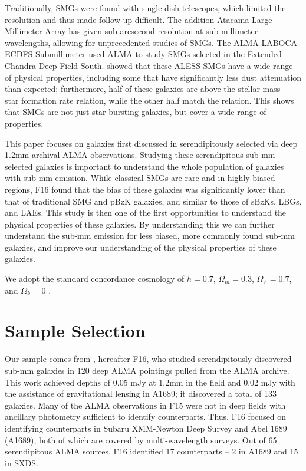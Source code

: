 \documentclass[preprint,natbib209]{aastex}
\begin{document}
Traditionally, SMGs were found with single-dish telescopes, which limited the resolution and thus made follow-up difficult. The addition Atacama Large Millimeter Array has given sub arcsecond resolution at sub-millimeter wavelengths, allowing for unprecedented studies of SMGs. The ALMA LABOCA ECDFS Submillimeter \citep[ALESS;][]{hodge13} used ALMA to study SMGs selected in the Extended Chandra Deep Field South. \cite{dacunha15} showed that these ALESS SMGs have a wide range of physical properties, including some that have significantly less dust attenuation than expected; furthermore, half of these galaxies are above the stellar mass -- star formation rate relation, while the other half match the relation. This shows that SMGs are not just star-bursting galaxies, but cover a wide range of properties.

This paper focuses on galaxies first discussed in \cite{fujimoto16} serendipitously selected via deep 1.2mm archival ALMA observations. 
Studying these serendipitous sub-mm selected galaxies is important to understand the whole population of galaxies with sub-mm emission.
While classical SMGs are rare and in highly biased regions, F16 found that the bias of these galaxies was significantly lower than that of traditional SMG and pBzK galaxies, and similar to those of sBzKs, LBGs, and LAEs. This study is then one of the first opportunities to understand the physical properties of these galaxies. By understanding this we can further understand the sub-mm emission for less biased, more commonly found sub-mm galaxies, and improve our understanding of the physical properties of these galaxies.

We adopt the standard concordance cosmology of $h = 0.7$, $\Omega_m = 0.3$, $\Omega_\Lambda = 0.7$, 
and $\Omega_k = 0$ \citep{planck13}.

\section{Sample Selection} 
\label{sec:sample}

Our sample comes from \citet{fujimoto16}, hereafter F16, who studied serendipitously discovered sub-mm galaxies in 
120 deep ALMA pointings pulled from the ALMA archive. This work achieved depths of 0.05 mJy at 1.2mm in the field and 0.02 mJy 
with the assistance of gravitational lensing in A1689; it discovered a total of 133 galaxies. Many of the ALMA observations in F15 were not
in deep fields with ancillary photometry sufficient to identify counterparts. Thus, F16 focused on identifying counterparts in Subaru XMM-Newton Deep 
Survey \citep[SXDS;][]{furusawa08} and Abel 1689 (A1689), both of which are covered by multi-wavelength surveys. 
Out of 65 serendipitous ALMA sources, F16 identified 17 counterparts -- 2 in A1689 and 15 in SXDS. 
\end{document}
